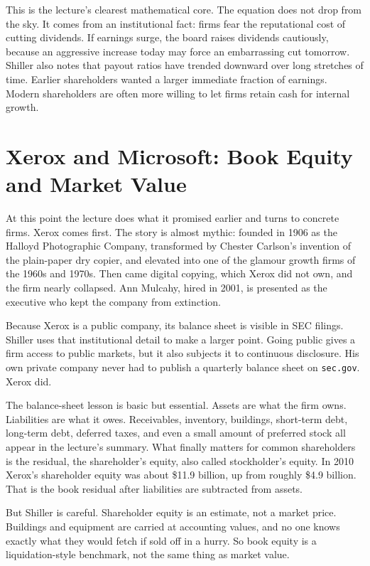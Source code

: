 This is the lecture's clearest mathematical core. The equation does not drop from the sky. It comes from an institutional fact: firms fear the reputational cost of cutting dividends. If earnings surge, the board raises dividends cautiously, because an aggressive increase today may force an embarrassing cut tomorrow. Shiller also notes that payout ratios have trended downward over long stretches of time. Earlier shareholders wanted a larger immediate fraction of earnings. Modern shareholders are often more willing to let firms retain cash for internal growth.

\section{Xerox and Microsoft: Book Equity and Market Value}

At this point the lecture does what it promised earlier and turns to concrete firms. Xerox comes first. The story is almost mythic: founded in 1906 as the Halloyd Photographic Company, transformed by Chester Carlson's invention of the plain-paper dry copier, and elevated into one of the glamour growth firms of the 1960s and 1970s. Then came digital copying, which Xerox did not own, and the firm nearly collapsed. Ann Mulcahy, hired in 2001, is presented as the executive who kept the company from extinction.

Because Xerox is a public company, its balance sheet is visible in SEC filings. Shiller uses that institutional detail to make a larger point. Going public gives a firm access to public markets, but it also subjects it to continuous disclosure. His own private company never had to publish a quarterly balance sheet on \texttt{sec.gov}. Xerox did.

The balance-sheet lesson is basic but essential. Assets are what the firm owns. Liabilities are what it owes. Receivables, inventory, buildings, short-term debt, long-term debt, deferred taxes, and even a small amount of preferred stock all appear in the lecture's summary. What finally matters for common shareholders is the residual, the shareholder's equity, also called stockholder's equity. In 2010 Xerox's shareholder equity was about \$11.9 billion, up from roughly \$4.9 billion. That is the book residual after liabilities are subtracted from assets.

But Shiller is careful. Shareholder equity is an estimate, not a market price. Buildings and equipment are carried at accounting values, and no one knows exactly what they would fetch if sold off in a hurry. So book equity is a liquidation-style benchmark, not the same thing as market value.

